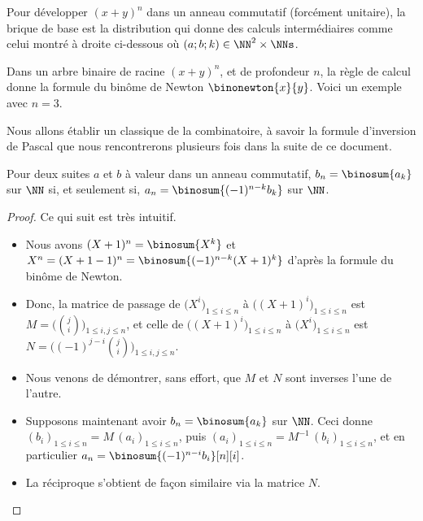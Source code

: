 Pour développer $(x + y)^n$ dans un anneau commutatif (forcément unitaire), la brique de base est la distribution qui donne des calculs intermédiaires comme celui montré à droite ci-dessous où $(a;b;k) \in \NN^2 \times \NNs$.

%
            {\intertree}{}

Dans un arbre binaire de racine $(x + y)^n$, et de profondeur $n$, la règle de calcul donne la formule du binôme de Newton
$\binonewton{x}{y}$.
%
Voici un exemple avec $n=3$.





Nous allons établir un classique de la combinatoire, à savoir la formule d'inversion de Pascal que nous rencontrerons plusieurs fois dans la suite de ce document.


\begin{fact} \label{pascal-inv}
	Pour deux suites $a$ et $b$ à valeur dans un anneau commutatif,
	$b_n = \binosum{a_k}$ sur $\NN$
	si, et seulement si,
	$a_n = \binosum{(-1)^{n-k} b_k}$ sur $\NN$.
\end{fact}


\begin{proof}
	Ce qui suit est très intuitif.
	\begin{itemize}
		\item Nous avons
		$(X + 1)^n = \binosum{X^k}$
		et
		$X^n = (X + 1 - 1)^n = \binosum{(-1)^{n-k} (X+1)^k}$
		d'après la formule du binôme de Newton.
		

		\item Donc, la matrice de passage de
		$\big( X^i \big)_{1 \leq i \leq n}$
		à
		$\big( (X + 1)^i \big)_{1 \leq i \leq n}$
		est
		$M = \big( \binom{j}{i} \big)_{1 \leq i, j \leq n}$,
		et celle de
		$\big( (X + 1)^i \big)_{1 \leq i \leq n}$
		à
		$\big( X^i \big)_{1 \leq i \leq n}$
		est
		$N = \big( (-1)^{j-i} \binom{j}{i} \big)_{1 \leq i, j \leq n}$.
		

		\item Nous venons de démontrer, sans effort, que $M$ et $N$ sont inverses l'une de l'autre.
		

		\item Supposons maintenant avoir $b_n = \binosum{a_k}$  sur $\NN$.
		Ceci donne
		$(b_i)_{1 \leq i \leq n} = M \, (a_i)_{1 \leq i \leq n}$,
		puis
		$(a_i)_{1 \leq i \leq n} = M^{-1} \, (b_i)_{1 \leq i \leq n}$,
		et en particulier
		$a_n = \binosum{(-1)^{n-i} b_i}[n][i]$.
		

		\item La réciproque s'obtient de façon similaire via la matrice $N$.
	\end{itemize}

	\null\vspace{-6ex}
\end{proof}


